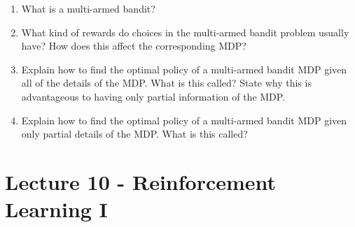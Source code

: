 \documentclass[]{article}
\begin{document}
\begin{enumerate}
\item What is a multi-armed bandit?
\item What kind of rewards do choices in the multi-armed bandit problem usually have? How does this affect the corresponding MDP?
\item Explain how to find the optimal policy of a multi-armed bandit MDP given all of the details of the MDP. What is this called? State why this is advantageous to having only partial information of the MDP.
\item Explain how to find the optimal policy of a multi-armed bandit MDP given only partial details of the MDP. What is this called?\\
\end{enumerate}

\section*{Lecture 10 - Reinforcement Learning I}
\end{document}
